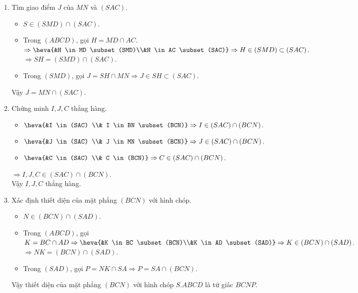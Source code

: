 \begin{bt}
{\begin{enumerate}
\begin{itemize}
				$\Rightarrow \heva{&O \in AC \subset (SAC)\\&O \in BD \subset (SBD)} \Rightarrow O \in (SAC) \cap \ (SBD)$.\\
				$\Rightarrow SO=(SAC) \cap (SBD)$.\\
				\item Trong $(SBD)$, gọi $I=BN \cap SO \Rightarrow I \in SO \subset (SAC)$.
			\end{itemize}
			Vậy $I=	BN \cap (SAC)$.
			\item Tìm giao điểm $J$ của $MN$ và $(SAC)$.
			\begin{itemize}
				\item $ S \in (SMD) \cap (SAC)$.
				\item  Trong $(ABCD)$, gọi $H=MD \cap AC$.\\
				$ \Rightarrow \heva{&H \in MD \subset (SMD)\\&H \in AC \subset (SAC)}\Rightarrow H \in (SMD) \subset (SAC)$.\\
				$\Rightarrow SH = (SMD) \cap (SAC)$.
				\item  Trong $(SMD)$, gọi $J = SH \cap MN \Rightarrow J \in SH \subset (SAC)$.
			\end{itemize}
			Vậy $J =MN \cap (SAC)$. 
			\item Chứng minh $I, J, C$ thẳng hàng.
			\begin{itemize}
				\item $\heva{&I \in (SAC) \\& I \in BN \subset (BCN)} \Rightarrow I \in (SAC) \cap (BCN)$.
				\item $\heva{&J \in (SAC) \\& J \in MN \subset (BCN)} \Rightarrow J \in (SAC) \cap (BCN)$.
				\item $\heva{&C \in (SAC) \\& C \in  (BCN)} \Rightarrow C \in (SAC) \cap (BCN)$.
			\end{itemize}
			$\Rightarrow I, J, C \in (SAC) \cap (BCN)$.\\
			Vậy $I, J, C$ thẳng hàng.
			\item Xác định thiết diện của mặt phẳng $(BCN)$ với hình chóp.
			\begin{itemize}
				\item $N \in (BCN) \cap (SAD)$.
				\item  Trong $(ABCD)$, gọi $K = BC \cap AD \Rightarrow \heva{&K \in BC \subset (BCN)\\&K \in AD \subset (SAD)} \Rightarrow K \in (BCN) \cap (SAD)$.\\
				$\Rightarrow NK =(BCN) \cap (SAD)$.
				\item Trong $(SAD)$, gọi $P =NK \cap SA \Rightarrow P = SA \cap (BCN)$.
			\end{itemize}
			Vậy thiết diện của mặt phẳng $(BCN)$ với hình chóp $S.ABCD$ là tứ giác $BCNP$.
		\end{enumerate}
	}
\end{bt}

